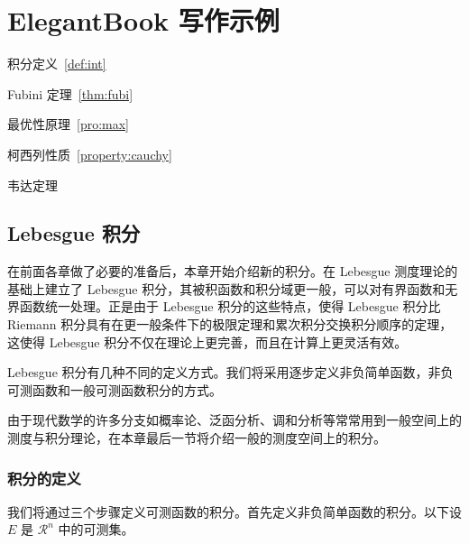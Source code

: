 \documentclass[lang=cn,10pt,cite=super]{elegantbook}
\begin{document}
\chapter{ElegantBook 写作示例}

\begin{introduction}
  \item 积分定义~\ref{def:int}
  \item Fubini 定理~\ref{thm:fubi}
  \item 最优性原理~\ref{pro:max}
  \item 柯西列性质~\ref{property:cauchy}
  \item 韦达定理
\end{introduction}

\section{Lebesgue 积分}
在前面各章做了必要的准备后，本章开始介绍新的积分。在 Lebesgue 测度理论的基础上建立了 Lebesgue 积分，其被积函数和积分域更一般，可以对有界函数和无界函数统一处理。正是由于 Lebesgue 积分的这些特点，使得 Lebesgue 积分比 Riemann 积分具有在更一般条件下的极限定理和累次积分交换积分顺序的定理，这使得 Lebesgue 积分不仅在理论上更完善，而且在计算上更灵活有效。

Lebesgue 积分有几种不同的定义方式。我们将采用逐步定义非负简单函数，非负可测函数和一般可测函数积分的方式。

由于现代数学的许多分支如概率论、泛函分析、调和分析等常常用到一般空间上的测度与积分理论，在本章最后一节将介绍一般的测度空间上的积分。

\subsection{积分的定义}

我们将通过三个步骤定义可测函数的积分。首先定义非负简单函数的积分。以下设 $E$ 是 $\mathcal{R}^n$ 中的可测集。

\end{document}
